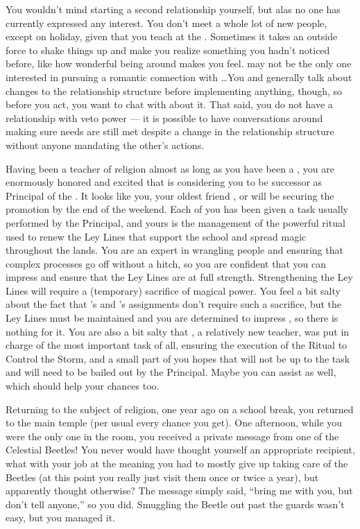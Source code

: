 \documentclass[char]{GL2020}
\begin{document}
You wouldn't mind starting a second relationship yourself, but alas no one has currently expressed any interest. You don't meet a whole lot of new people, except on holiday, given that you teach at the \pSc{}. Sometimes it takes an outside force to shake things up and make you realize something you hadn’t noticed before, like how wonderful being around \cEthics{} makes you feel. \cJuniorStatesman{} may not be the only one interested in pursuing a romantic connection with \cEthics{}\ldots You and \cJuniorStatesman{} generally talk about changes to the relationship structure before implementing anything, though, so before you act, you want to chat with \cJuniorStatesman{} about it. That said, you do not have a relationship with veto power — it is possible to have conversations around making sure needs are still met despite a change in the relationship structure without anyone mandating the other's actions.

Having been a teacher of religion almost as long as you have been a \cBeetle{\cleric}, you are enormously honored and excited that \cPrincipal{} is considering you to be \cPrincipal{\their} successor as Principal of the \pSchool{}. It looks like you, your oldest friend \cMusic{}, or \cChupSecond{\full} will be securing the promotion by the end of the weekend. Each of you has been given a task usually performed by the Principal, and yours is the management of the powerful ritual used to renew the Ley Lines that support the school and spread magic throughout the lands. You are an expert in wrangling people and ensuring that complex processes go off without a hitch, so you are confident that you can impress \cPrincipal{} and ensure that the Ley Lines are at full strength. Strengthening the Ley Lines will require a (temporary) sacrifice of magical power. You feel a bit salty about the fact that \cMusic{}’s and \cChupSecond{}'s assignments don’t require such a sacrifice, but the Ley Lines must be maintained and you are determined to impress \cPrincipal{}, so there is nothing for it. You are also a bit salty that \cChupSecond{}, a relatively new teacher, was put in charge of the most important task of all, ensuring the execution of the Ritual to Control the Storm, and a small part of you hopes that \cChupSecond{\they} will not be up to the task and will need to be bailed out by the Principal. Maybe you can assist as well, which should help your chances too.

Returning to the subject of religion, one year ago on a school break, you returned to the main temple (per usual every chance you get). One afternoon, while you were the only one in the room, you received a private message from one of the Celestial Beetles! You never would have thought yourself an appropriate recipient, what with your job at the \pSc{} meaning you had to mostly give up taking care of the Beetles (at this point you really just visit them once or twice a year), but apparently \cTechGod{} thought otherwise? The message simply said, ``bring me with you, but don't tell anyone,'' so you did. Smuggling the Beetle out past the guards wasn't easy, but you managed it.
\end{document}

